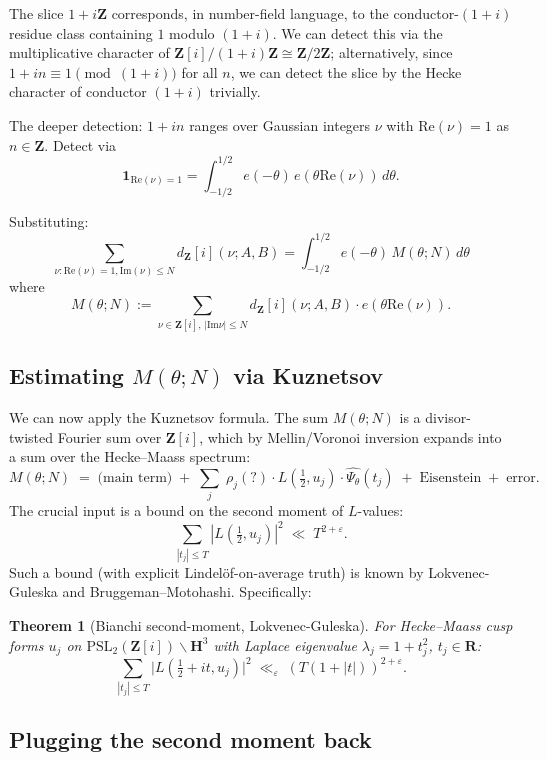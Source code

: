 \documentclass[11pt]{article}
\newtheorem{theorem}{Theorem}[section]
\theoremstyle{definition}
\newcommand{\Z}{\mathbf{Z}}
\newcommand{\R}{\mathbf{R}}
\newcommand{\HH}{\mathbf{H}}
\newcommand{\Zi}{\Z[i]}
\newcommand{\Re}{\mathrm{Re}}
\newcommand{\Im}{\mathrm{Im}}
\renewcommand{\Re}{\mathrm{Re}}
\renewcommand{\Im}{\mathrm{Im}}
\begin{document}
The slice $1+i\Z$ corresponds, in number-field language, to the conductor-$(1+i)$ residue class containing $1$ modulo $(1+i)$. We can detect this via the multiplicative character of $\Zi/(1+i)\Z\cong\Z/2\Z$; alternatively, since $1+in\equiv 1\pmod{(1+i)}$ for all $n$, we can detect the slice by the Hecke character of conductor $(1+i)$ trivially.

The deeper detection: $1+in$ ranges over Gaussian integers $\nu$ with $\Re(\nu)=1$ as $n\in\Z$. Detect via
\[
\mathbf{1}_{\Re(\nu)=1}=\int_{-1/2}^{1/2}e(-\theta)\,e(\theta\Re(\nu))\,d\theta.
\]

Substituting:
\[
\sum_{\nu:\Re(\nu)=1,\Im(\nu)\le N}d_\Zi(\nu;A,B)=\int_{-1/2}^{1/2}e(-\theta)\,M(\theta;N)\,d\theta
\]
where
\[
M(\theta;N):=\sum_{\nu\in\Zi,\,|\Im\nu|\le N}d_\Zi(\nu;A,B)\cdot e(\theta\Re(\nu)).
\]

\subsection{Estimating $M(\theta;N)$ via Kuznetsov}

We can now apply the Kuznetsov formula. The sum $M(\theta;N)$ is a divisor-twisted Fourier sum over $\Zi$, which by Mellin/Voronoi inversion expands into a sum over the Hecke--Maass spectrum:
\begin{equation}\label{eq:M-spectral}
M(\theta;N)\;=\;\text{(main term)}\;+\;\sum_j\;\rho_j(?)\cdot L(\tfrac12,u_j)\cdot\widehat{\Psi_\theta}(t_j)\;+\;\text{Eisenstein}\;+\;\text{error}.
\end{equation}
The crucial input is a bound on the second moment of $L$-values:
\[
\sum_{|t_j|\le T}|L(\tfrac12,u_j)|^2\;\ll\;T^{2+\varepsilon}.
\]
Such a bound (with explicit Lindel\"of-on-average truth) is known by Lokvenec-Guleska and Bruggeman--Motohashi. Specifically:

\begin{theorem}[Bianchi second-moment, Lokvenec-Guleska]\label{thm:bianchi-second-moment}
For Hecke--Maass cusp forms $u_j$ on $\mathrm{PSL}_2(\Zi)\backslash\HH^3$ with Laplace eigenvalue $\lambda_j=1+t_j^2$, $t_j\in\R$:
\[
\sum_{|t_j|\le T}\bigl|L(\tfrac12+it,u_j)\bigr|^2\;\ll_\varepsilon\;(T(1+|t|))^{2+\varepsilon}.
\]
\end{theorem}

\subsection{Plugging the second moment back}
\end{document}
